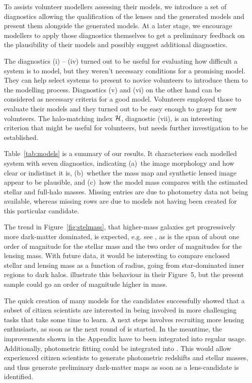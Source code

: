 To assists volunteer modellers assessing their models, we introduce a
set of diagnostics allowing the qualification of the lenses and the
generated models and present them alongside the generated models. At a
later stage, we encourage modellers to apply those diagnostics
themselves to get a preliminary feedback on the plausibility of their
models and possibly suggest additional diagnostics.

The diagnostics (i) -- (iv) turned out to be useful for evaluating how difficult a system is to model, but they weren't necessary conditions for a promising model.
They can help select systems to present to novice volunteers to introduce them to the modelling process.
Diagnostics (v) and (vi) on the other hand can be considered as necessary criteria for a good model.
Volunteers employed those to evaluate their models and they turned out to be easy enough to grasp for new volunteers.
The halo-matching index $\mathcal{H}$, diagnostic (vii), is an interesting criterion that might be useful for volunteers, but needs further investigation to be established.


Table~\ref{tab:models} is a summary of our results.  It characterises
each modelled system with seven diagnostics, indicating (a)~the image
morphology and how clear or indistinct it is, (b)~whether the mass map
and synthetic lensed image appear to be plausible, and (c)~how the
model mass compares with the estimated stellar and full-halo masses.
Missing entries are due to photometry data not being available, whereas
missing rows are due to models not having been created for this particular
candidate.

The trend in Figure~\ref{fig:stelmass}, that higher-mass galaxies get 
progressively more dark-matter dominated, is expected, e.g. see 
\cite{2005ApJ...623L...5F}, as is the span of about one order of magnitude for 
the stellar mass and the two order of magnitudes for the lensing mass. With 
future data, it would be interesting to compare enclosed stellar and lensing 
mass as a function of radius, going from star-dominated inner regions to dark 
halos. \cite{2011ApJ...740...97L} illustrate this behaviour in their Figure~5, 
but the present sample could go an order of magnitude higher in mass.

The quick creation of many models for the {\SW} candidates successfully showed 
that a subset of citizen scientists are interested in being involved in more 
challenging tasks that take some time to learn. A next steps involves 
recruiting more lensing enthusiasts, as soon as the next round of {\SW} is 
started. In the meantime, the improvements shown in the Appendix have to been 
integrated into regular {\SpL} usage. Additionally, photometric fitting could 
be integrated into {\SpL}. This would allow experienced citizen scientists to 
generate photometric redshifts and stellar masses, and thus generate 
preliminary dark-matter maps as soon as a lens-candidate is identified.

